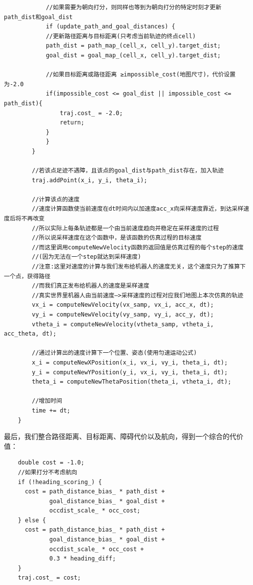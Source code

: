 \documentclass[9pt, oneside]{book}
\begin{document}
\begin{verbatim}
            //如果需要为朝向打分，则同样也等到为朝向打分的特定时刻才更新path_dist和goal_dist
            if (update_path_and_goal_distances) {
            //更新路径距离与目标距离(只考虑当前轨迹的终点cell)
            path_dist = path_map_(cell_x, cell_y).target_dist;
            goal_dist = goal_map_(cell_x, cell_y).target_dist;

            //如果目标距离或路径距离 ≥impossible_cost(地图尺寸)，代价设置为-2.0
            if(impossible_cost <= goal_dist || impossible_cost <= path_dist){
                traj.cost_ = -2.0;
                return;
            }
            }
        }

        //若该点足迹不遇障，且该点的goal_dist与path_dist存在，加入轨迹
        traj.addPoint(x_i, y_i, theta_i);

        //计算该点的速度
        //速度计算函数使当前速度在dt时间内以加速度acc_x向采样速度靠近，到达采样速度后将不再改变
        //所以实际上每条轨迹都是一个由当前速度趋向并稳定在采样速度的过程
        //所以说采样速度在这个函数中，是该函数的仿真过程的目标速度
        //而这里调用computeNewVelocity函数的返回值是仿真过程的每个step的速度
        //(因为无法在一个step就达到采样速度)
        //注意:这里对速度的计算与我们发布给机器人的速度无关，这个速度只为了推算下一个点，获得路径
        //而我们真正发布给机器人的速度是采样速度
        //真实世界里机器人由当前速度–>采样速度的过程对应我们地图上本次仿真的轨迹
        vx_i = computeNewVelocity(vx_samp, vx_i, acc_x, dt);
        vy_i = computeNewVelocity(vy_samp, vy_i, acc_y, dt);
        vtheta_i = computeNewVelocity(vtheta_samp, vtheta_i, acc_theta, dt);

        //通过计算出的速度计算下一个位置、姿态(使用匀速运动公式)
        x_i = computeNewXPosition(x_i, vx_i, vy_i, theta_i, dt);
        y_i = computeNewYPosition(y_i, vx_i, vy_i, theta_i, dt);
        theta_i = computeNewThetaPosition(theta_i, vtheta_i, dt);

        //增加时间
        time += dt;
    }
\end{verbatim}
\normalsize

最后，我们整合路径距离、目标距离、障碍代价以及航向，得到一个综合的代价值：

\small
\begin{verbatim}
    double cost = -1.0;
    //如果打分不考虑航向
    if (!heading_scoring_) {
      cost = path_distance_bias_ * path_dist + 
             goal_distance_bias_ * goal_dist + 
             occdist_scale_ * occ_cost;
    } else {
      cost = path_distance_bias_ * path_dist + 
             goal_distance_bias_ * goal_dist + 
             occdist_scale_ * occ_cost + 
             0.3 * heading_diff;
    }
    traj.cost_ = cost;
\end{verbatim}
\normalsize
\end{document}
